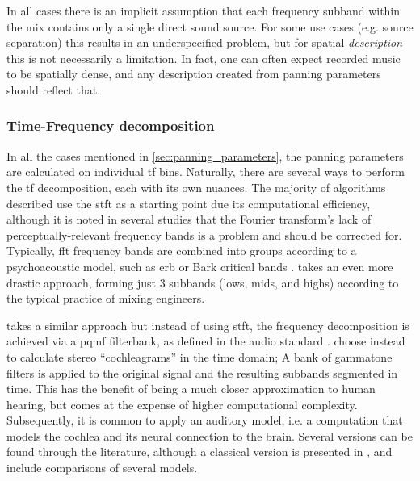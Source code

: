 \documentclass[referee,pdflatex,sn-mathphys-num]{sn-jnl}%
\newcommand{\q}[1]{\enquote{#1}}
\begin{document}
In all cases there is an implicit assumption that each frequency subband within the mix contains only a single direct sound source. For some use cases (e.g. source separation) this results in an underspecified problem, but for spatial \textit{description} this is not necessarily a limitation. In fact, one can often expect recorded music to be spatially dense, and any description created from panning parameters should reflect that.


\subsubsection{Time-Frequency decomposition}
\label{sec:tf_decomp}
In all the cases mentioned in \cref{sec:panning_parameters}, the panning parameters are calculated on individual \gls{tf} bins. Naturally, there are several ways to perform the \gls{tf} decomposition, each with its own nuances. The majority of algorithms described use the \gls{stft} as a starting point due its computational efficiency, although it is noted in several studies that the Fourier transform's lack of perceptually-relevant frequency bands is a problem and should be corrected for. Typically, \gls{fft} frequency bands are combined into groups according to a psychoacoustic model, such as \gls{erb} or Bark  critical bands \cite{smithiiiEquivalentRectangularBandwidth2020,smithiiiBarkFrequencyScale2020}. \cite{tzanetakisStereoPanningFeatures2007} takes an even more drastic approach, forming just 3 subbands (lows, mids, and highs) according to the typical practice of mixing engineers.

\cite{liUnsupervisedAdaptiveFiltering2005} takes a similar approach but instead of using \gls{stft}, the frequency decomposition is achieved via a \gls{pqmf} filterbank, as defined in the  audio standard \cite{iso-11172-3:mpeg_audio}. \cite{zhuConversionStereoSignal2014,tardieuProductionEffectAudio2011,desenaLocalizationUncertaintyTimeAmplitude2020} choose instead to calculate stereo \q{cochleagrams} in the time domain; A bank of gammatone filters is applied to the original signal and the resulting subbands segmented in time. This has the benefit of being a much closer approximation to human hearing, but comes at the expense of higher computational complexity. Subsequently, it is common to apply an auditory model, i.e. a computation that models the cochlea and its neural connection to the brain. Several versions can be found through the literature, although a classical version is presented in \cite{boddenBinauralModelingAuditory1995}, and \cite{supperOnsetGuidedSpatialAnalyser2005,delgadoDesignChoicesBinaural2023} include comparisons of several models.
\end{document}
